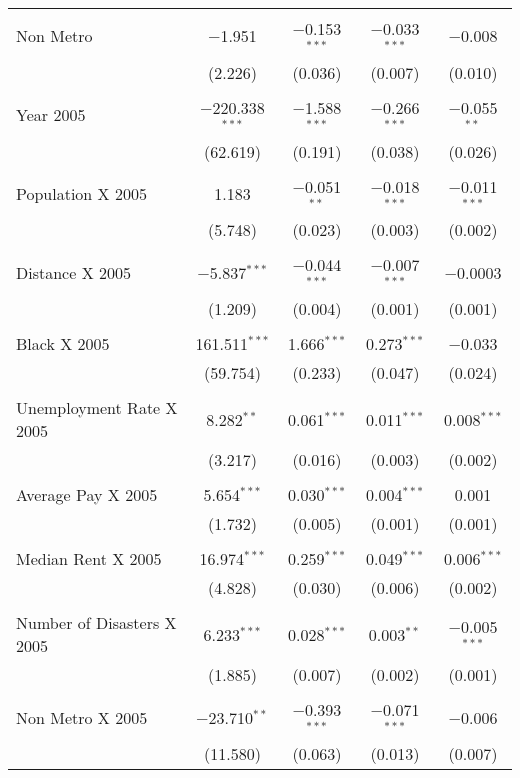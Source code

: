 \documentclass[]{article}
\begin{document}
\begin{table}[!htbp]
\begin{tabular}{@{\extracolsep{5pt}}lcccc}
  & & & & \\ 
 Non Metro & $-$1.951 & $-$0.153$^{***}$ & $-$0.033$^{***}$ & $-$0.008 \\ 
  & (2.226) & (0.036) & (0.007) & (0.010) \\ 
  & & & & \\ 
 Year 2005 & $-$220.338$^{***}$ & $-$1.588$^{***}$ & $-$0.266$^{***}$ & $-$0.055$^{**}$ \\ 
  & (62.619) & (0.191) & (0.038) & (0.026) \\ 
  & & & & \\ 
 Population X 2005 & 1.183 & $-$0.051$^{**}$ & $-$0.018$^{***}$ & $-$0.011$^{***}$ \\ 
  & (5.748) & (0.023) & (0.003) & (0.002) \\ 
  & & & & \\ 
 Distance X 2005 & $-$5.837$^{***}$ & $-$0.044$^{***}$ & $-$0.007$^{***}$ & $-$0.0003 \\ 
  & (1.209) & (0.004) & (0.001) & (0.001) \\ 
  & & & & \\ 
 Black X 2005 & 161.511$^{***}$ & 1.666$^{***}$ & 0.273$^{***}$ & $-$0.033 \\ 
  & (59.754) & (0.233) & (0.047) & (0.024) \\ 
  & & & & \\ 
 Unemployment Rate X 2005  & 8.282$^{**}$ & 0.061$^{***}$ & 0.011$^{***}$ & 0.008$^{***}$ \\ 
  & (3.217) & (0.016) & (0.003) & (0.002) \\ 
  & & & & \\ 
 Average Pay X 2005 & 5.654$^{***}$ & 0.030$^{***}$ & 0.004$^{***}$ & 0.001 \\ 
  & (1.732) & (0.005) & (0.001) & (0.001) \\ 
  & & & & \\ 
 Median Rent X 2005 & 16.974$^{***}$ & 0.259$^{***}$ & 0.049$^{***}$ & 0.006$^{***}$ \\ 
  & (4.828) & (0.030) & (0.006) & (0.002) \\ 
  & & & & \\ 
 Number of Disasters X 2005 & 6.233$^{***}$ & 0.028$^{***}$ & 0.003$^{**}$ & $-$0.005$^{***}$ \\ 
  & (1.885) & (0.007) & (0.002) & (0.001) \\ 
  & & & & \\ 
 Non Metro X 2005 & $-$23.710$^{**}$ & $-$0.393$^{***}$ & $-$0.071$^{***}$ & $-$0.006 \\ 
  & (11.580) & (0.063) & (0.013) & (0.007) \\ 

\end{tabular}
\end{table}
\end{document}
